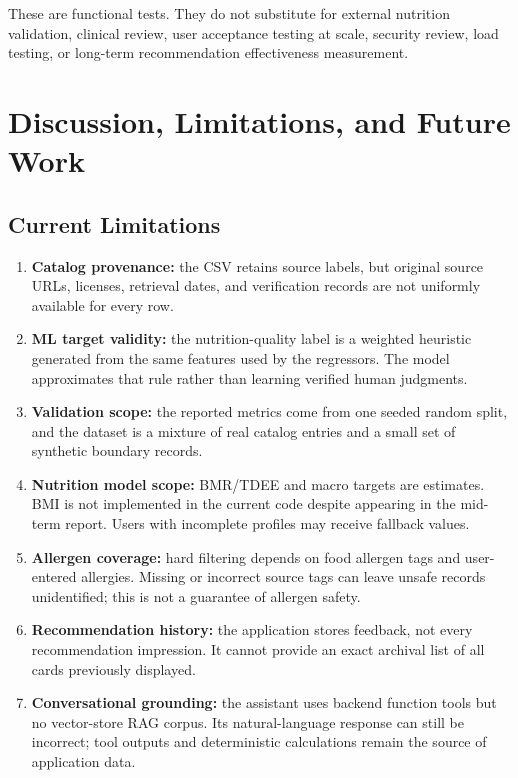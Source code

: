 \documentclass[12pt,a4paper]{report}
\begin{document}
These are functional tests. They do not substitute for external nutrition validation,
clinical review, user acceptance testing at scale, security review, load testing, or
long-term recommendation effectiveness measurement.

\chapter{Discussion, Limitations, and Future Work}
\section{Current Limitations}
\begin{enumerate}
  \item \textbf{Catalog provenance:} the CSV retains source labels, but original source
        URLs, licenses, retrieval dates, and verification records are not uniformly
        available for every row.
  \item \textbf{ML target validity:} the nutrition-quality label is a weighted heuristic
        generated from the same features used by the regressors. The model approximates
        that rule rather than learning verified human judgments.
  \item \textbf{Validation scope:} the reported metrics come from one seeded random
        split, and the dataset is a mixture of real catalog entries and a small set of
        synthetic boundary records.
  \item \textbf{Nutrition model scope:} BMR/TDEE and macro targets are estimates. BMI
        is not implemented in the current code despite appearing in the mid-term report.
        Users with incomplete profiles may receive fallback values.
  \item \textbf{Allergen coverage:} hard filtering depends on food allergen tags and
        user-entered allergies. Missing or incorrect source tags can leave unsafe records
        unidentified; this is not a guarantee of allergen safety.
  \item \textbf{Recommendation history:} the application stores feedback, not every
        recommendation impression. It cannot provide an exact archival list of all cards
        previously displayed.
  \item \textbf{Conversational grounding:} the assistant uses backend function tools but
        no vector-store RAG corpus. Its natural-language response can still be incorrect;
        tool outputs and deterministic calculations remain the source of application data.
\end{enumerate}
\end{document}
